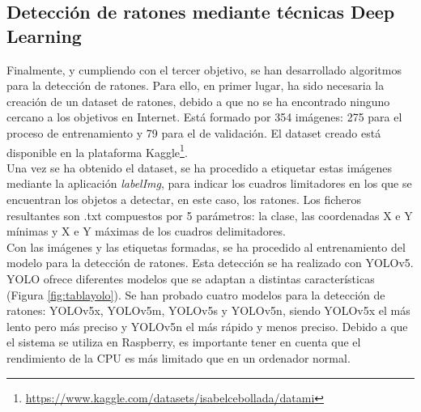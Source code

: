 \subsection{Detección de ratones mediante técnicas Deep Learning}
Finalmente, y cumpliendo con el tercer objetivo, se han desarrollado algoritmos para la detección de ratones. Para ello, en primer lugar, ha sido necesaria la creación de un dataset de ratones, debido a que no se ha encontrado ninguno cercano a los objetivos en Internet. Está formado por 354 imágenes: 275 para el proceso de entrenamiento y 79 para el de validación. El dataset creado está disponible en la plataforma Kaggle\footnote{\url{https://www.kaggle.com/datasets/isabelcebollada/datami}}.\\

Una vez se ha obtenido el dataset, se ha procedido a etiquetar estas imágenes mediante la aplicación \textit{labelImg}, para indicar los cuadros limitadores en los que se encuentran los objetos a detectar, en este caso, los ratones. Los ficheros resultantes son .txt compuestos por 5 parámetros: la clase, las coordenadas X e Y mínimas y X e Y máximas de los cuadros delimitadores.\\

Con las imágenes y las etiquetas formadas, se ha procedido al entrenamiento del modelo para la detección de ratones. Esta detección se ha realizado con YOLOv5. YOLO ofrece diferentes modelos que se adaptan a distintas características (Figura \ref{fig:tablayolo}). Se han probado cuatro modelos para la detección de ratones: YOLOv5x, YOLOv5m, YOLOv5s y YOLOv5n, siendo YOLOv5x el más lento pero más preciso y YOLOv5n el más rápido y menos preciso. Debido a que el sistema se utiliza en Raspberry, es importante tener en cuenta que el rendimiento de la CPU es más limitado que en un ordenador normal.\\

